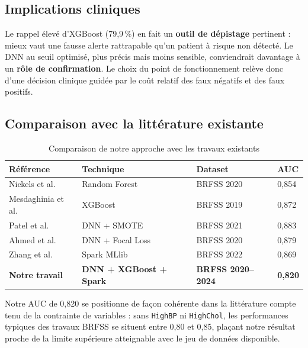 \documentclass[12pt,a4paper]{report}
\begin{document}

\subsection{Implications cliniques}

Le rappel élevé d'\acs{XGBoost} (79,9\,\%) en fait un \textbf{outil de dépistage}
pertinent : mieux vaut une fausse alerte rattrapable qu'un patient à risque non
détecté. Le DNN au seuil optimisé, plus précis mais moins sensible, conviendrait
davantage à un \textbf{rôle de confirmation}. Le choix du point de fonctionnement
relève donc d'une décision clinique guidée par le coût relatif des faux négatifs
et des faux positifs.

\subsection{Comparaison avec la littérature existante}

\begin{table}[H]
\centering
\caption{Comparaison de notre approche avec les travaux existants}
\label{tab:comparaison_lit}
\begin{tabularx}{\textwidth}{L{3cm} L{3.2cm} L{2.8cm} C{2.5cm}}
\toprule
\textbf{Référence} & \textbf{Technique} & \textbf{Dataset} & \textbf{AUC} \\
\midrule
Nickels et al. \cite{nickels2023}
  & Random Forest & BRFSS 2020 & 0,854 \\
Mesdaghinia et al. \cite{mesdaghinia2022}
  & XGBoost & BRFSS 2019 & 0,872 \\
Patel et al. \cite{patel2023}
  & DNN + SMOTE & BRFSS 2021 & 0,883 \\
Ahmed et al. \cite{ahmed2023}
  & DNN + Focal Loss & BRFSS 2020 & 0,879 \\
Zhang et al. \cite{zhang2023}
  & Spark MLlib & BRFSS 2022 & 0,869 \\
\textbf{Notre travail}
  & \textbf{DNN + XGBoost + Spark} & \textbf{BRFSS 2020--2024} & \textbf{0,820} \\
\bottomrule
\end{tabularx}
\end{table}

Notre AUC de 0,820 se positionne de façon cohérente dans la littérature compte tenu
de la contrainte de variables : sans \texttt{HighBP} ni \texttt{HighChol}, les
performances typiques des travaux BRFSS se situent entre 0,80 et 0,85, plaçant notre
résultat proche de la limite supérieure atteignable avec le jeu de données disponible.
\end{document}
